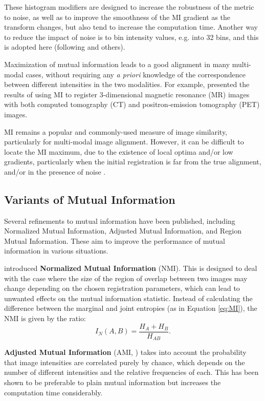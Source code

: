 \documentclass{report}
\begin{document}
These histogram modifiers are designed to increase the robustness of the metric to noise, as well as to improve the smoothness of the MI gradient as the transform changes, but also tend to increase the computation time. Another way to reduce the impact of noise is to bin intensity values, e.g. into 32 bins, and this is adopted here (following \cite{gee2003biomedical} and others).

Maximization of mutual information leads to a good alignment in many multi-modal cases, without requiring any \textit{a priori} knowledge of the correspondence between different intensities in the two modalities. For example, \cite{wells1996multi} presented the results of using MI to register 3-dimensional magnetic resonance (MR) images with both computed tomography (CT) and positron-emission tomography (PET) images. 

MI remains a popular and commonly-used measure of image similarity, particularly for multi-modal image alignment. However, it can be difficult to locate the MI maximum, due to the existence of local optima and/or low gradients, particularly when the initial registration is far from the true alignment, and/or in the presence of noise \citep{maes1997multimodality}.

\subsection{Variants of Mutual Information}
Several refinements to mutual information have been published, including Normalized Mutual Information, Adjusted Mutual Information, and Region Mutual Information. These aim to improve the performance of mutual information in various situations.

\cite{studholme1999overlap} introduced \textbf{Normalized Mutual Information} (NMI). This is designed to deal with the case where the size of the region of overlap between two images may change depending on the chosen registration parameters, which can lead to unwanted effects on the mutual information statistic. Instead of calculating the difference between the marginal and joint entropies (as in Equation \ref{eq:MI}), the NMI is given by the ratio:
\begin{equation}
I_N(A,B) = \frac{H_A + H_B}{H_{AB}}.
\label{eq:NMI}
\end{equation}

\textbf{Adjusted Mutual Information} (AMI, \cite{vinh2009information}) takes into account the probability that image intensities are correlated purely by chance, which depends on the number of different intensities and the relative frequencies of each. This has been shown to be preferable to plain mutual information \citep{vinh2009information} but increases the computation time considerably.
\end{document}
